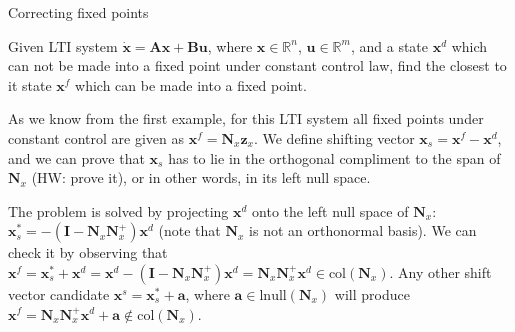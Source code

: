 \documentclass{beamer}
\begin{document}
\begin{frame}{Correcting fixed points}
\begin{flushleft}

Given LTI system $\dot{\mathbf{x}} = \mathbf{A} \mathbf{x} + \mathbf{B} \mathbf{u}$, where $\mathbf{x} \in \mathbb{R}^n$, $\mathbf{u} \in \mathbb{R}^m$, and a state $\mathbf{x}^d$ which can not be made into a fixed point under constant control law, find the closest to it state $\mathbf{x}^f$ which can be made into a fixed point.

\bigskip

As we know from the first example, for this LTI system all fixed points under constant control are given as $\mathbf{x}^f = \mathbf{N}_x \mathbf{z}_x$. We define shifting vector $\mathbf{x}_s = \mathbf{x}^f - \mathbf{x}^d$, and we can prove that $\mathbf{x}_s$ has to lie in the orthogonal compliment to the span of $\mathbf{N}_x$ (HW: prove it), or in other words, in its left null space.

\bigskip

The problem is solved by projecting $\mathbf{x}^d$ onto the left null space of $\mathbf{N}_x$: $\mathbf{x}^*_s = -(\mathbf{I} - \mathbf{N}_x\mathbf{N}^+_x)\mathbf{x}^d$ (note that $\mathbf{N}_x$ is not an orthonormal basis). We can check it by observing that $\mathbf{x}^f = \mathbf{x}^*_s + \mathbf{x}^d = \mathbf{x}^d - (\mathbf{I} - \mathbf{N}_x\mathbf{N}^+_x)\mathbf{x}^d = \mathbf{N}_x\mathbf{N}^+_x \mathbf{x}^d \in \text{col}(\mathbf{N}_x)$. Any other shift vector candidate $\mathbf{x}^s = \mathbf{x}^*_s + \mathbf{a}$, where $\mathbf{a} \in \text{lnull}(\mathbf{N}_x)$ will produce $\mathbf{x}^f =  \mathbf{N}_x\mathbf{N}^+_x \mathbf{x}^d + \mathbf{a} \notin \text{col}(\mathbf{N}_x)$.

\end{flushleft}
\end{frame}
\end{document}
